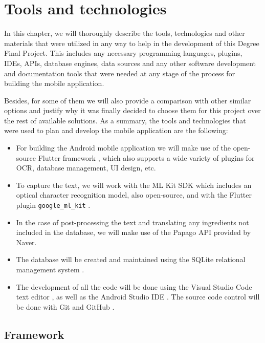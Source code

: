 \chapter{Tools and technologies}
\label{chapter5}

In this chapter, we will thoroughly describe the tools, technologies and other materials that were utilized in any way to help in the development of this Degree Final Project. This includes any necessary programming languages, plugins, IDEs, APIs, database engines, data sources and any other software development and documentation tools that were needed at any stage of the process for building the mobile application.

Besides, for some of them we will also provide a comparison with other similar options and justify why it was finally decided to choose them for this project over the rest of available solutions. As a summary, the tools and technologies that were used to plan and develop the mobile application are the following:

\begin{itemize}
\item For building the Android mobile application we will make use of the open-source Flutter framework \cite{noauthor_flutter_2021}, which also supports a wide variety of plugins for OCR, database management, UI design, etc.
\item To capture the text, we will work with the ML Kit SDK \cite{noauthor_ml_nodate} which includes an optical character recognition model, also open-source, and with the Flutter plugin \texttt{google\_ml\_kit} \cite{noauthor_google_ml_kit_nodate}.
\item In the case of post-processing the text and translating any ingredients not included in the database, we will make use of the Papago API \cite{noauthor__nodate} provided by Naver.
\item The database will be created and maintained using the SQLite relational management system \cite{noauthor_sqlite_nodate}.
\item The development of all the code will be done using the Visual Studio Code text editor \cite{noauthor_documentation_2021}, as well as the Android Studio IDE \cite{noauthor_introduccion_2021}. The source code control will be done with Git \cite{noauthor_git_2021} and GitHub \cite{noauthor_githubcom_2021}.
\end{itemize}

\section{Framework}

